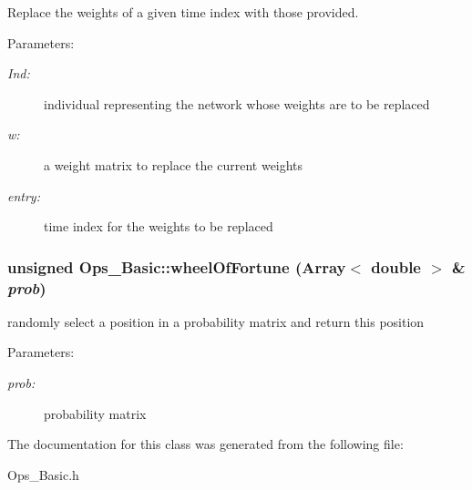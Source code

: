 Replace the weights of a given time index with those provided.

\begin{Desc}
\item[Parameters: ]\par
\begin{description}
\item[{\em 
Ind:}]individual representing the network whose weights are to be replaced \item[{\em 
w:}]a weight matrix to replace the current weights \item[{\em 
entry:}]time index for the weights to be replaced \end{description}
\end{Desc}
\subsubsection{\setlength{\rightskip}{0pt plus 5cm}unsigned Ops\_\-Basic::wheel\-Of\-Fortune (Array$<$ double $>$ \& {\em prob})\hspace{0.3cm}{\tt  [protected]}}\label{classOps__Basic_b4}


randomly select a position in a probability matrix and return this position

\begin{Desc}
\item[Parameters: ]\par
\begin{description}
\item[{\em 
prob:}]probability matrix \end{description}
\end{Desc}


The documentation for this class was generated from the following file:\begin{CompactItemize}
\item 
Ops\_\-Basic.h\end{CompactItemize}
